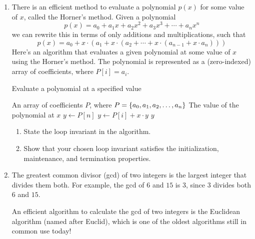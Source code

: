 \begin{exercises}
\begin{enumerate}
        \item There is an efficient method to evaluate a polynomial $p\left(x\right)$ for some value of $x$, called the Horner's method. Given a polynomial
            \[
                p\left(x\right) = a_0 + a_1 x + a_2 x^2 + a_3 x^3 + \cdots + a_n x^n
            \]
        we can rewrite this in terms of only additions and multiplications, such that
        \[
            p\left(x\right) = a_0 + x\cdot\left(a_1 + x\cdot\left(a_2 + \cdots + x\cdot\left(a_{n-1} + x\cdot a_n\right)\right)\right)
        \]
        Here's an algorithm that evaluates a given polynomial at some value of $x$ using the Horner's method. The polynomial is represented as a (zero-indexed) array of coefficients, where $P[i] = a_i$.
        \begin{algorithm}[H]
            \caption{Evaluate a polynomial at a specified value}
            \begin{algorithmic}[1]
                \Require An array of coefficients $P$, where $P = \left\{a_0, a_1, a_2, \ldots, a_n\right\}$
                \Ensure The value of the polynomial at $x$
                    \State $y \gets P[n]$
                        \State $y \gets P[i] + x\cdot y$
                    \EndFor
                    \Return $y$
                \EndFunction
            \end{algorithmic}
        \end{algorithm}

        \begin{enumerate}
            \item State the loop invariant in the algorithm.
            \item Show that your chosen loop invariant satisfies the initialization, maintenance, and termination properties.
        \end{enumerate}

    \item[\challenge] The greatest common divisor (gcd) of two integers is the largest integer that divides them both. For example, the gcd of $6$ and $15$ is $3$, since $3$ divides both $6$ and $15$.

        An efficient algorithm to calculate the gcd of two integers is the Euclidean algorithm (named after Euclid), which is one of the oldest algorithms still in common use today! 


\end{enumerate}
\end{exercises}
